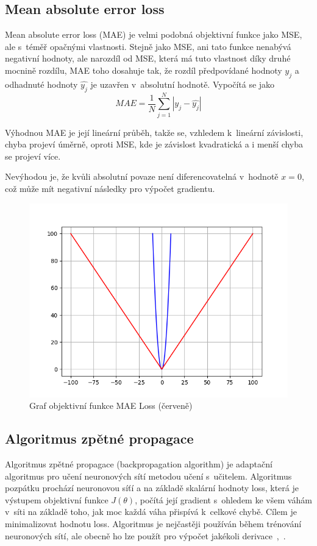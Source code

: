 \subsection*{Mean absolute error loss}
Mean absolute error loss (MAE) je velmi podobná objektivní funkce jako MSE, ale s~téměř opačnými vlastnosti. Stejně jako MSE, ani tato funkce nenabývá negativní hodnoty, ale narozdíl od MSE, která má tuto vlastnost díky druhé mocnině rozdílu, MAE toho dosahuje tak, že rozdíl předpovídané hodnoty $y_j$ a odhadnuté hodnoty $\hat{y_j}$ je uzavřen v~absolutní hodnotě. Vypočítá se jako
\begin{equation}
  MAE = \frac{1}{N}\sum_{j=1}^N|y_j - \hat{y_j}|
\end{equation}

Výhodnou MAE je její lineární průběh, takže se, vzhledem k~lineární závislosti, chyba projeví úměrně, oproti MSE, kde je závislost kvadratická a i menší chyba se projeví více.

Nevýhodou je, že kvůli absolutní povaze není diferencovatelná v~hodnotě $x=0$, což může mít negativní následky pro výpočet gradientu.

\begin{figure}[H]
    \centering
    \includegraphics[scale=0.4]{obrazky-figures/maeloss.png}
    \caption{\label{fig:maeloss}Graf objektivní funkce MAE Loss (červeně)}
\end{figure}


\subsection{Algoritmus zpětné propagace}
Algoritmus zpětné propagace (backpropagation algorithm) je adaptační algoritmus pro učení neuronových sítí metodou učení s~učitelem. Algoritmus pozpátku prochází neuronovou síťí a na základě skalární hodnoty loss, která je výstupem objektivní funkce $J(\theta)$, počítá její gradient s~ohledem ke všem váhám v~síti na základě toho, jak moc každá váha přispívá k~celkové chybě. Cílem je minimalizovat hodnotu loss. Algoritmus je nejčastěji používán během trénování neuronových sítí, ale obecně ho lze použít pro výpočet jakékoli derivace~\cite{mitdeeplearning_small},~\cite{mitdeeplearning}.

